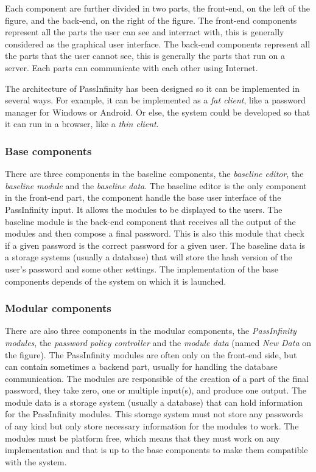 \documentclass[twocolumn,14pt]{extarticle}
\begin{document}
Each component are further divided in two parts, the front-end, on the left of the figure, and the back-end, on the right of the figure. The front-end components represent all the parts the user can see and interract with, this is generally considered as the graphical user interface. The back-end components represent all the parts that the user cannot see, this is generally the parts that run on a server. Each parts can communicate with each other using Internet.

The architecture of PassInfinity has been designed so it can be implemented in several ways. For example, it can be implemented as a \textit{fat client}, like a password manager for Windows or Android. Or else, the system could be developed so that it can run in a browser, like a \textit{thin client}.

\subsubsection{Base components}

There are three components in the baseline components, the \textit{baseline editor}, the \textit{baseline module} and the \textit{baseline data}. The baseline editor is the only component in the front-end part, the component handle the base user interface of the PassInfinity input. It allows the modules to be displayed to the users. The baseline module is the back-end component that receives all the output of the modules and then compose a final password. This is also this module that check if a given password is the correct password for a given user. The baseline data is a storage systems (usually a database) that will store the hash version of the user's password and some other settings. The implementation of the base components depends of the system on which it is launched.

\subsubsection{Modular components}

There are also three components in the modular components, the \textit{PassInfinity modules}, the \textit{password policy controller} and the \textit{module data} (named \textit{New Data} on the figure). The PassInfinity modules are often only on the front-end side, but can contain sometimes a backend part, usually for handling the database communication. The modules are responsible of the creation of a part of the final password, they take zero, one or multiple input(s), and produce one output. The module data is a storage system (usually a database) that can hold information for the PassInfinity modules. This storage system must not store any passwords of any kind but only store necessary information for the modules to work. The modules must be platform free, which means that they must work on any implementation and that is up to the base components to make them compatible with the system.
\end{document}
